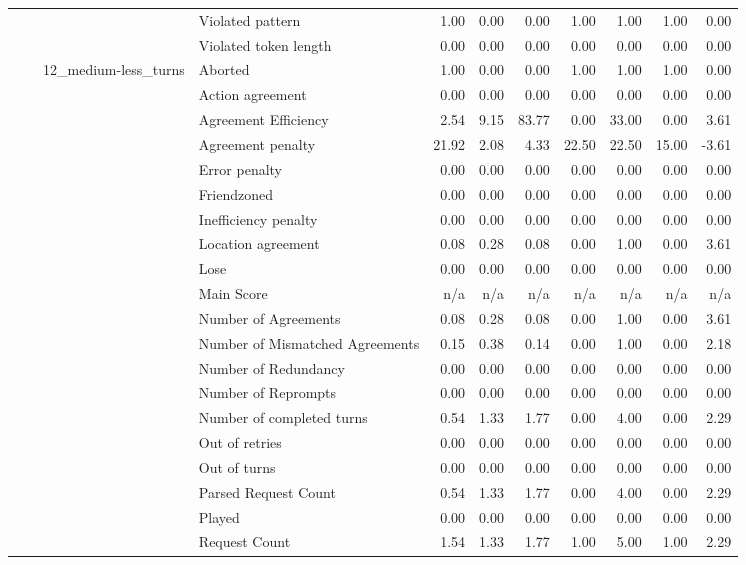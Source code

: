 \begin{tabular}{llllrrrrrrr}
 &  &  & Violated pattern & 1.00 & 0.00 & 0.00 & 1.00 & 1.00 & 1.00 & 0.00 \\
 &  &  & Violated token length & 0.00 & 0.00 & 0.00 & 0.00 & 0.00 & 0.00 & 0.00 \\
\cline{3-11}
 &  & \multirow[t]{27}{*}{12_medium-less_turns} & Aborted & 1.00 & 0.00 & 0.00 & 1.00 & 1.00 & 1.00 & 0.00 \\
 &  &  & Action agreement & 0.00 & 0.00 & 0.00 & 0.00 & 0.00 & 0.00 & 0.00 \\
 &  &  & Agreement Efficiency & 2.54 & 9.15 & 83.77 & 0.00 & 33.00 & 0.00 & 3.61 \\
 &  &  & Agreement penalty & 21.92 & 2.08 & 4.33 & 22.50 & 22.50 & 15.00 & -3.61 \\
 &  &  & Error penalty & 0.00 & 0.00 & 0.00 & 0.00 & 0.00 & 0.00 & 0.00 \\
 &  &  & Friendzoned & 0.00 & 0.00 & 0.00 & 0.00 & 0.00 & 0.00 & 0.00 \\
 &  &  & Inefficiency penalty & 0.00 & 0.00 & 0.00 & 0.00 & 0.00 & 0.00 & 0.00 \\
 &  &  & Location agreement & 0.08 & 0.28 & 0.08 & 0.00 & 1.00 & 0.00 & 3.61 \\
 &  &  & Lose & 0.00 & 0.00 & 0.00 & 0.00 & 0.00 & 0.00 & 0.00 \\
 &  &  & Main Score & n/a & n/a & n/a & n/a & n/a & n/a & n/a \\
 &  &  & Number of Agreements & 0.08 & 0.28 & 0.08 & 0.00 & 1.00 & 0.00 & 3.61 \\
 &  &  & Number of Mismatched Agreements & 0.15 & 0.38 & 0.14 & 0.00 & 1.00 & 0.00 & 2.18 \\
 &  &  & Number of Redundancy & 0.00 & 0.00 & 0.00 & 0.00 & 0.00 & 0.00 & 0.00 \\
 &  &  & Number of Reprompts & 0.00 & 0.00 & 0.00 & 0.00 & 0.00 & 0.00 & 0.00 \\
 &  &  & Number of completed turns & 0.54 & 1.33 & 1.77 & 0.00 & 4.00 & 0.00 & 2.29 \\
 &  &  & Out of retries & 0.00 & 0.00 & 0.00 & 0.00 & 0.00 & 0.00 & 0.00 \\
 &  &  & Out of turns & 0.00 & 0.00 & 0.00 & 0.00 & 0.00 & 0.00 & 0.00 \\
 &  &  & Parsed Request Count & 0.54 & 1.33 & 1.77 & 0.00 & 4.00 & 0.00 & 2.29 \\
 &  &  & Played & 0.00 & 0.00 & 0.00 & 0.00 & 0.00 & 0.00 & 0.00 \\
 &  &  & Request Count & 1.54 & 1.33 & 1.77 & 1.00 & 5.00 & 1.00 & 2.29 \\

\end{tabular}

